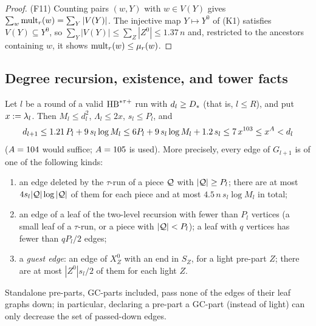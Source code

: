\begin{proof}
(F11) Counting pairs $(w,Y)$ with $w\in V(Y)$ gives
$\sum_w\mathrm{mult}_r(w)=\sum_Y|V(Y)|$. The injective map $Y\mapsto Y^0$ of (K1)
satisfies $V(Y)\subseteq Y^0$, so $\sum_Y|V(Y)|\le\sum_{Z}|Z^0|\le1.37\,n$ and,
restricted to the ancestors containing $w$, it shows $\mathrm{mult}_r(w)\le\mu_r(w)$.
\end{proof}

\subsection{Degree recursion, existence, and tower facts}

\begin{proposition}\label{s2:propDegRec}
Let $l$ be a round of a valid $\mathrm{HB}^{*\tau{+}}$ run with $d_l\ge D_{*}$ (that is,
$l\le R$), and put $x\mathrel{:=}\lambda_l$. Then $M_l\le d_l^2$, $\Lambda_l\le2x$,
$s_l\le P_l$, and
\[
d_{l+1}\le1.21\,P_l+9\,s_l\log M_l\le6P_l+9\,s_l\log M_l+1.2\,s_l\le
7\,x^{103}\le x^{A}<d_l
\]
($A=104$ would suffice; $A=105$ is used). More precisely, every edge of
$G_{l+1}$ is of one of the following kinds:
\begin{enumerate}
\item[(a)] an edge deleted by the $\tau$-run of a piece $\mathcal{Q}$ with
$|\mathcal{Q}|\ge P_l$; there are at most $4s_l|\mathcal{Q}|\log|\mathcal{Q}|$ of them for
each piece and at most $4.5\,n\,s_l\log M_l$ in total;
\item[(b)] an edge of a leaf of the two-level recursion with fewer than $P_l$
vertices (a small leaf of a $\tau$-run, or a piece with $|\mathcal{Q}|<P_l$); a leaf
with $q$ vertices has fewer than $qP_l/2$ edges;
\item[(c)] a \emph{guest edge}: an edge of $X^0_Z$ with an end in $S_Z$, for a
light pre-part $Z$; there are at most $|Z^0|s_l/2$ of them for each light $Z$.
\end{enumerate}
Standalone pre-parts, GC-parts included, pass none of the edges of their leaf
graphs down; in particular, declaring a pre-part a GC-part (instead of light)
can only decrease the set of passed-down edges.
\deps{\ref{s2:lem14tau}, \ref{s2:lemCap}, \ref{s2:propOV}, \ref{s2:defHBtp}, \ref{s2:lemSEP}, \ref{s1:condG1}, \ref{s2:lemOVgeneric}}
\end{proposition}


